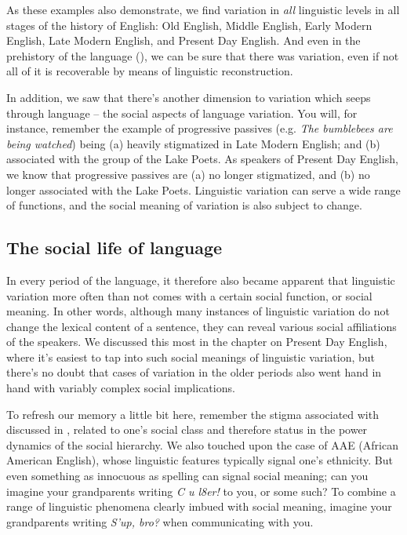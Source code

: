 \noindent As these examples also demonstrate, we find variation in \textit{all} linguistic levels in all stages of the history of English: Old English, Middle English, Early Modern English, Late Modern English, and Present Day English. And even in the prehistory of the language (), we can be sure that there was variation, even if not all of it is recoverable by means of linguistic reconstruction.

In addition, we saw that there's another dimension to variation which seeps through language -- the social aspects of language variation. You will, for instance, remember the example of progressive passives (e.g. \textit{The bumblebees are being watched}) being (a) heavily stigmatized in Late Modern English; and (b) associated with the group of the Lake Poets. As speakers of Present Day English, we know that progressive passives are (a) no longer stigmatized, and (b) no longer associated with the Lake Poets. Linguistic variation can serve a wide range of functions, and the social meaning of variation is also subject to change.

\subsection{The social life of language}
In every period of the language, it therefore also became apparent that linguistic variation more often than not comes with a certain social function, or social meaning. In other words, although many instances of linguistic variation do not change the lexical content of a sentence, they can reveal various social affiliations of the speakers. We discussed this most in the chapter on Present Day English, where it's easiest to tap into such social meanings of linguistic variation, but there's no doubt that cases of variation in the older periods also went hand in hand with variably complex social implications.

To refresh our memory a little bit here, remember the stigma associated with  discussed in , related to one's social class and therefore status in the power dynamics of the social hierarchy. We also touched upon the case of AAE (African American English), whose linguistic features typically signal one's ethnicity. But even something as innocuous as spelling can signal social meaning; can you imagine your grandparents writing \textit{C u l8er!} to you, or some such? To combine a range of linguistic phenomena clearly imbued with social meaning, imagine your grandparents writing \textit{S'up, bro?} when communicating with you.

